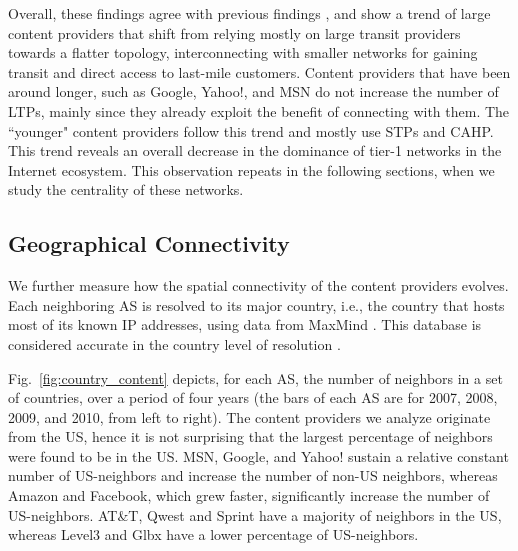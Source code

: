 \documentclass[conference]{IEEEtran}
\newcommand{\ignore}[1]{}
\newcommand{\figref}[1]{Fig.~\ref{#1}}
\newcommand{\figsize}{0.45}
\begin{document}
Overall, these findings agree with previous findings \cite{flatnet,labovitz,amogh2010}, and show a trend of large content providers that shift from
relying mostly on large transit
providers towards a flatter topology, interconnecting with smaller networks for gaining transit
and direct access to last-mile customers. Content providers that have been around longer, such as Google, Yahoo!, and MSN do not increase
the number of LTPs, mainly since they already exploit the benefit of connecting with them. The
``younger" content providers follow this trend and mostly use STPs and CAHP. This trend reveals an overall
decrease in the dominance
of tier-1 networks in the Internet ecosystem. This observation repeats in the following sections, when we
study the centrality of these networks.



\subsection{Geographical Connectivity}
We further measure how the spatial connectivity of the content providers evolves. Each neighboring AS is resolved to its major country, i.e.,
the country that hosts most of its known IP addresses,
using data from MaxMind \cite{maxmind}. This database is considered accurate in the country level of resolution \cite{maxmind-problem,noa_geolocation}.

\ignore{
\begin{figure}[tbh]
\centering
    \subfloat[Content]{
	\label{fig:country_content}
    \epsfig{file=fig/neighbor_country_content_real,width=\figsize\textwidth}
    }
    \hspace{-1mm}
    \subfloat[Transit]{
    \label{fig:country_transit}
    \epsfig{file=fig/neighbor_country_transit_real,width=\figsize\textwidth}
    }
    \caption{Distribution of neighbor types}
    \label{fig:neighbor_country}
\end{figure}
}

\figref{fig:country_content} depicts, for each AS, the number of neighbors in a set of countries, over a period
of four years (the bars of each AS are for 2007, 2008, 2009, and 2010, from left to right).
The content providers we analyze originate from the US, hence it is not surprising that the largest percentage of
neighbors were found to be in the US. MSN, Google, and Yahoo! sustain a relative constant number of US-neighbors and
increase the number of non-US neighbors, whereas Amazon and Facebook, which grew faster, significantly increase the number of US-neighbors. AT\&T, Qwest and Sprint have a majority of neighbors in the US, whereas Level3 and Glbx have a lower percentage of US-neighbors. 
\end{document}
